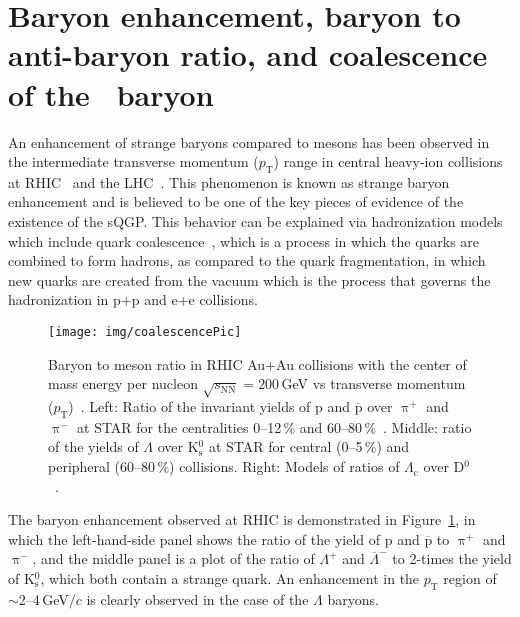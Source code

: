 \section{Baryon enhancement, baryon to anti-baryon ratio, and coalescence of the \Lambdac\ baryon}

An enhancement of strange baryons compared to mesons has been observed in the intermediate transverse momentum ($p_\mathrm{T}$) range in central heavy-ion collisions at RHIC~\cite{STARLambda} and the LHC~\cite{LambdaALICE}\@. This phenomenon is known as strange baryon enhancement and is believed to be one of the key pieces of evidence of the existence of the sQGP\@. This behavior can be explained via hadronization models which include quark coalescence~\cite{coalescenceKrakow,coalescenceKFKI}, which is a process in which the quarks are combined to form hadrons, as compared to the quark fragmentation, in which new quarks are created from the vacuum which is the process that governs the hadronization in p+p and e+e collisions.  

\begin{figure}
\centering
\texttt{[image: img/coalescencePic]}
\caption[Baryon to meson ratio in RHIC Au+Au collisions.]{Baryon to meson ratio in RHIC Au+Au collisions with the center of mass energy per nucleon $\sqrt{s_\mathrm{NN}} = 200\,$GeV vs transverse momentum ($p_\mathrm{T}$)~\cite{GuannanLc}\@. Left: Ratio of the invariant yields of p and $\overline{\mathrm{p}}$ over $\uppi^+$ and $\uppi^-$ at STAR for the centralities 0--12$\,\%$ and 60--80$\,\%$~\cite{STARLambda}. Middle: ratio of the yields of $\Lambda$ over K$^0_\mathrm{s}$ at STAR for central (0--5$\,\%$) and peripheral (60--80$\,\%$) collisions. Right: Models of ratios of $\Lambda_\mathrm{c}$ over D$^0$~\cite{LcCoalescence_OhKoLeeYasui, Ghosh_Lc_rescattering, SHM}.}
\label{fig:LambdaKzero}
\end{figure}

The baryon enhancement observed at RHIC is demonstrated in Figure~\ref{fig:LambdaKzero}, in which the left-hand-side panel shows the ratio of the yield of p and $\overline{\mathrm{p}}$ to $\uppi^+$ and $\uppi^-$, and the middle panel is a plot of the ratio of $\Lambda^+$ and $\overline{\Lambda}^-$ to 2-times the yield of K$^0_\mathrm{s}$, which both contain a strange quark. An enhancement in the $p_\mathrm{T}$ region of $\sim$2--4$\,$GeV$/c$ is clearly observed in the case of the $\Lambda$ baryons. 

